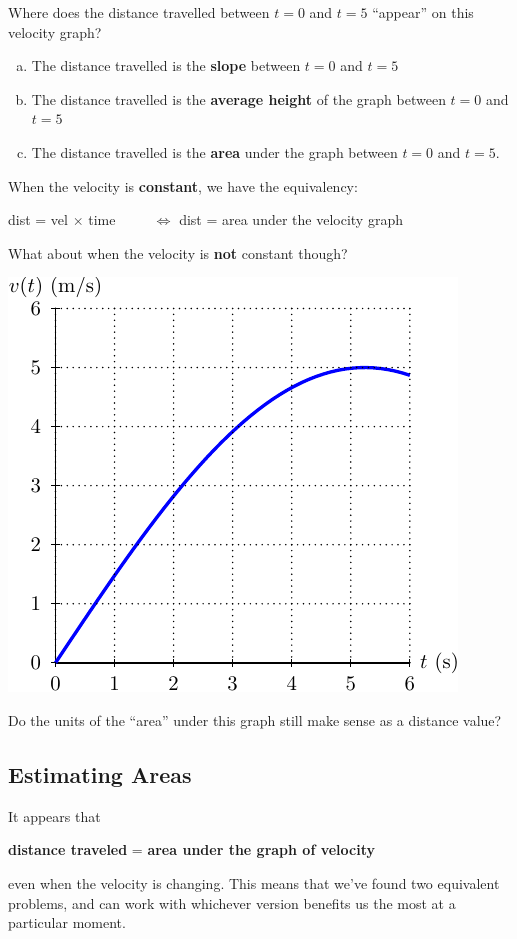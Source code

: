 Where does the distance travelled between $t=0$ and $t=5$ ``appear''
on this velocity graph?
\begin{enumerate}[(a)]
\item The distance travelled is the {\bf slope} between $t=0$ and $t=5$  \\[1ex]
\item The distance travelled is the {\bf average height} of the graph between $t=0$ and $t=5$  \\[1ex]
\item The distance travelled is the {\bf area} under the graph between $t=0$
  and $t=5$.
\end{enumerate}

\newpage

When the velocity is {\bf constant}, we have the equivalency:
\vspace{0.2in}
\begin{center}
dist = vel $\times$ time ~~~~ $\Longleftrightarrow$ dist = area under the velocity graph
\end{center}
\vspace{0.2in}

\problem 
What about when the velocity is {\bf not} constant though?

\begin{center}
\includegraphics[width=0.35\linewidth]{graphics/notes_04_variable_velocity}
\end{center}

Do the units of the ``area'' under this graph still make sense as a
distance value?


\vfill
\newpage
{}
\subsection*{Estimating Areas}

It appears that
\begin{center}
{\bf distance traveled} = {\bf area under the graph of velocity}
\end{center}
even when the velocity is changing.  This means that we've found two
equivalent problems, and
can work with whichever version benefits us the most at a particular moment. \\


